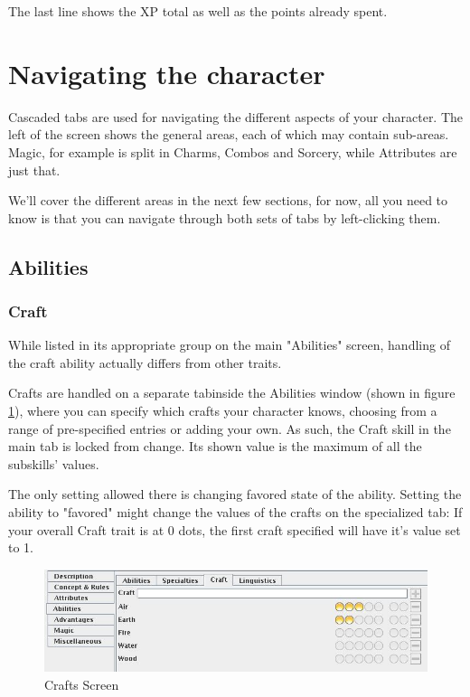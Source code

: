 The last line shows the XP total as well as the points already spent. 

\section{Navigating the character}
Cascaded tabs are used for navigating the different aspects of your character. The left of the screen shows the general areas, each of which may contain sub-areas. Magic, for example is split in Charms, Combos and Sorcery, while Attributes are just that.

We'll cover the different areas in the next few sections, for now, all you need to know is that you can navigate through both sets of tabs by left-clicking them.

\subsection{Abilities}
\subsubsection{Craft}
While listed in its appropriate group on the main "Abilities" screen, handling of the craft ability actually differs from other traits.

Crafts are handled on a separate tabinside the Abilities window (shown in figure \ref{fig:crafts}), where you can specify which crafts your character knows, choosing from a range of pre-specified entries or adding your own. As such, the Craft skill in the main tab is locked from change. Its shown value is the maximum of all the subskills' values.

The only setting allowed there is changing favored state of the ability. Setting the ability to "favored" might change the values of the crafts on the specialized tab: If your overall Craft trait is at 0 dots, the first craft specified will have it's value set to 1.

\begin{figure}
	\centering
		\includegraphics[width=1.00\textwidth]{images/crafts.jpg}
	\caption{Crafts Screen}
	\label{fig:crafts}
\end{figure}


